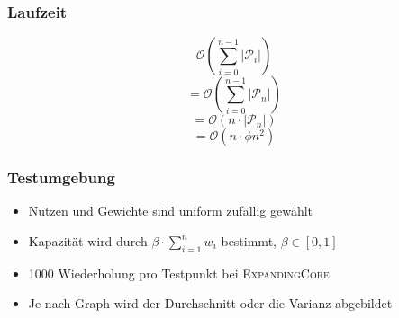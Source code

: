 \documentclass{presentation}
\begin{document}



\begin{frame}
    \frametitle{Laufzeit}
    $$\mathcal O(\sum_{i=0}^{n-1} |\mathcal{P}_i|)$$
    \pause
    $$ = \mathcal O(\sum_{i=0}^{n-1} |\mathcal{P}_n|)$$
    $$ = \mathcal O(n \cdot |\mathcal{P}_n|)$$
    $$ = \mathcal O(n \cdot \phi n^2)$$
\end{frame}



\begin{frame}
\end{frame}



\begin{frame}
    \frametitle{Testumgebung}
    \begin{itemize}
        \item Nutzen und Gewichte sind uniform zufällig gewählt
        \pause

        \item Kapazität wird durch $\beta \cdot \sum_{i=1}^n w_i$ bestimmt, $\beta \in [0, 1]$
        \pause

        \item 1000 Wiederholung pro Testpunkt bei \textsc{ExpandingCore}
        \pause

        \item Je nach Graph wird der Durchschnitt oder die Varianz abgebildet
    \end{itemize}
\end{frame}
\end{document}
